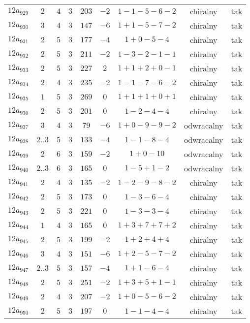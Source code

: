 \begin{longtable}{ccccccccc}
$12a_{929}$ & $2$ & $4$ & $3$ & $203$ & $-2$ & $1-1-5-6-2$ & chiralny & tak \\
$12a_{930}$ & $3$ & $4$ & $3$ & $147$ & $-6$ & $1+1-5-7-2$ & chiralny & tak \\
$12a_{931}$ & $2$ & $5$ & $3$ & $177$ & $-4$ & $1+0-5-4$ & chiralny & tak \\
$12a_{932}$ & $2$ & $5$ & $3$ & $211$ & $-2$ & $1-3-2-1-1$ & chiralny & tak \\
$12a_{933}$ & $2$ & $5$ & $3$ & $227$ & $2$ & $1+1+2+0-1$ & chiralny & tak \\
$12a_{934}$ & $2$ & $4$ & $3$ & $235$ & $-2$ & $1-1-7-6-2$ & chiralny & tak \\
$12a_{935}$ & $1$ & $5$ & $3$ & $269$ & $0$ & $1+1+1+0+1$ & chiralny & tak \\
$12a_{936}$ & $2$ & $5$ & $3$ & $201$ & $0$ & $1-2-4-4$ & chiralny & tak \\
$12a_{937}$ & $3$ & $4$ & $3$ & $79$ & $-6$ & $1+0-9-9-2$ & odwracalny & tak \\
$12a_{938}$ & $2..3$ & $5$ & $3$ & $133$ & $-4$ & $1-1-8-4$ & odwracalny & tak \\
$12a_{939}$ & $2$ & $6$ & $3$ & $159$ & $-2$ & $1+0-10$ & odwracalny & tak \\
$12a_{940}$ & $2..3$ & $6$ & $3$ & $165$ & $0$ & $1-5+1-2$ & odwracalny & tak \\
$12a_{941}$ & $2$ & $4$ & $3$ & $135$ & $-2$ & $1-2-9-8-2$ & chiralny & tak \\
$12a_{942}$ & $2$ & $5$ & $3$ & $173$ & $0$ & $1-3-6-4$ & chiralny & tak \\
$12a_{943}$ & $2$ & $5$ & $3$ & $221$ & $0$ & $1-3-3-4$ & chiralny & tak \\
$12a_{944}$ & $1$ & $4$ & $3$ & $165$ & $0$ & $1+3+7+7+2$ & chiralny & tak \\
$12a_{945}$ & $2$ & $5$ & $3$ & $199$ & $-2$ & $1+2+4+4$ & chiralny & tak \\
$12a_{946}$ & $3$ & $4$ & $3$ & $151$ & $-6$ & $1+2-5-7-2$ & chiralny & tak \\
$12a_{947}$ & $2..3$ & $5$ & $3$ & $157$ & $-4$ & $1+1-6-4$ & chiralny & tak \\
$12a_{948}$ & $2$ & $5$ & $3$ & $251$ & $-2$ & $1+3+5+1-1$ & chiralny & tak \\
$12a_{949}$ & $2$ & $4$ & $3$ & $207$ & $-2$ & $1+0-5-6-2$ & chiralny & tak \\
$12a_{950}$ & $2$ & $5$ & $3$ & $197$ & $0$ & $1-1-4-4$ & chiralny & tak \\

\end{longtable}
